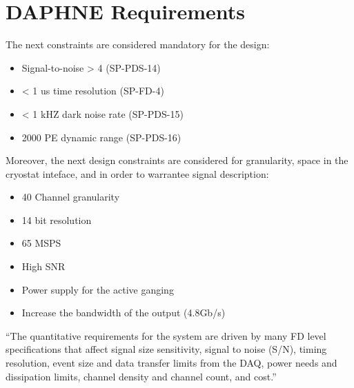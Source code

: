 \section{DAPHNE Requirements}
\label{sec:requirements}
The next constraints are considered mandatory for the design:
\begin{itemize}
    \item Signal-to-noise > 4 			(SP-PDS-14)
    \item < 1 us time resolution 		(SP-FD-4)
    \item < 1 kHZ dark noise rate 		(SP-PDS-15)
    \item 2000 PE dynamic range 		(SP-PDS-16)
\end{itemize}
Moreover, the next design constraints are considered for granularity, space in the cryostat inteface, and in order to warrantee signal description:
\begin{itemize}
\item 40 Channel granularity
\item 14 bit resolution
\item 65 MSPS
\item High SNR
\item Power supply for the active ganging
\item Increase the bandwidth of the output (4.8Gb/s)
\end{itemize}
\newpage
“The quantitative requirements for the system are driven by many FD level specifications that affect signal size sensitivity, signal to noise (S/N), timing resolution, event size and data transfer limits from the DAQ, power needs and dissipation limits, channel density and channel count, and cost.” 

